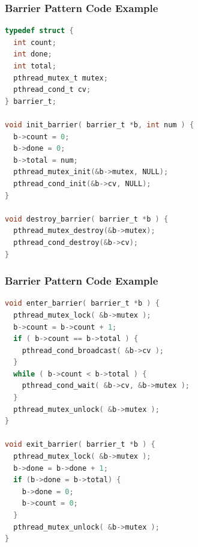 \begin{frame}[fragile]
	\frametitle{Barrier Pattern Code Example}
	\begin{lstlisting}[language=C]
typedef struct {
  int count;
  int done;
  int total;
  pthread_mutex_t mutex;
  pthread_cond_t cv;
} barrier_t;

void init_barrier( barrier_t *b, int num ) {
  b->count = 0;
  b->done = 0;
  b->total = num;
  pthread_mutex_init(&b->mutex, NULL);
  pthread_cond_init(&b->cv, NULL);
}

void destroy_barrier( barrier_t *b ) {
  pthread_mutex_destroy(&b->mutex);
  pthread_cond_destroy(&b->cv);
}
	\end{lstlisting}

\end{frame}

\begin{frame}[fragile]
	\frametitle{Barrier Pattern Code Example}
	\begin{lstlisting}[language=C]
void enter_barrier( barrier_t *b ) {
  pthread_mutex_lock( &b->mutex );
  b->count = b->count + 1;
  if ( b->count == b->total ) {
    pthread_cond_broadcast( &b->cv );
  }
  while ( b->count < b->total ) {
    pthread_cond_wait( &b->cv, &b->mutex );
  }
  pthread_mutex_unlock( &b->mutex );
}

void exit_barrier( barrier_t *b ) {
  pthread_mutex_lock( &b->mutex );
  b->done = b->done + 1;
  if (b->done = b->total) {
  	b->done = 0;
  	b->count = 0;
  }
  pthread_mutex_unlock( &b->mutex );
}
	\end{lstlisting}

\end{frame}


